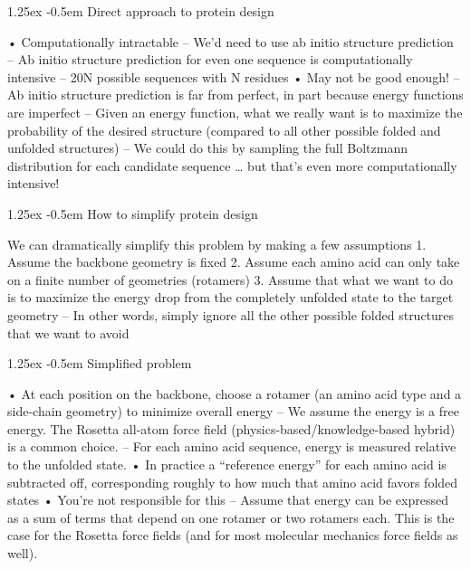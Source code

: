\documentclass[8pt]{article}
\makeatletter
\newlength{\norm}
\newlength{\nrm}
\renewcommand{\paragraph}{%
  \@startsection{paragraph}{4}%
  {\z@}{1.25ex \@plus 2pt \@minus 2pt}{-0.5em}%
  {\fontsize{\f@size}{\nrm}\normalfont\bfseries}%
}
\makeatother
\begin{document}
\paragraph{Direct approach to protein design}

• Computationally intractable
– We’d need to use ab initio structure prediction
– Ab initio structure prediction for even one sequence is
computationally intensive
– 20N possible sequences with N residues
• May not be good enough!
– Ab initio structure prediction is far from perfect, in part because
energy functions are imperfect
– Given an energy function, what we really want is to maximize
the probability of the desired structure (compared to all other
possible folded and unfolded structures)
– We could do this by sampling the full Boltzmann distribution for
each candidate sequence … but that’s even more
computationally intensive! 

\paragraph{How to simplify protein design}

We can dramatically simplify this
problem by making a few assumptions
1. Assume the backbone geometry is fixed
2. Assume each amino acid can only take on a
finite number of geometries (rotamers)
3. Assume that what we want to do is to maximize
the energy drop from the completely unfolded
state to the target geometry
– In other words, simply ignore all the other possible
folded structures that we want to avoid 

\paragraph{Simplified problem}

• At each position on the backbone, choose a rotamer (an amino acid type
and a side-chain geometry) to minimize overall energy
– We assume the energy is a free energy. The Rosetta all-atom force field
(physics-based/knowledge-based hybrid) is a common choice.
– For each amino acid sequence, energy is measured relative to the unfolded state.
• In practice a “reference energy” for each amino acid is subtracted off, corresponding
roughly to how much that amino acid favors folded states
• You’re not responsible for this
– Assume that energy can be expressed as a sum of terms that depend on one
rotamer or two rotamers each. This is the case for the Rosetta force fields (and
for most molecular mechanics force fields as well). 
\end{document}
